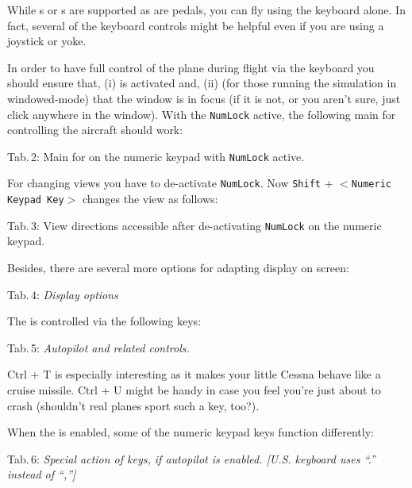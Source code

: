 While s or s are supported as are 
pedals, you can fly \FlightGear{} using the keyboard alone.  In fact, several of the keyboard
controls might be helpful even if you are using a joystick or yoke.  

In order to have full control
of the plane during flight via the keyboard you should ensure that, (i)  \texttt{}
is activated and, (ii) (for those running the simulation in windowed-mode) that the \FlightGear{} window is in focus (if it is not,
or you aren't sure, just click anywhere in the \FlightGear{} window).  With the \texttt{NumLock} active, the following main 
for controlling the aircraft should work:
 \eject

\noindent
 Tab.\,2: Main  for \FlightGear{} on the
 numeric keypad with \texttt{NumLock} active.
\medskip

\centerline{}
\vskip 5mm

For changing views you have to de-activate \texttt{NumLock}. Now \texttt{Shift}
+
$<$\texttt{Numeric Keypad Key}$>$ changes the view as follows:
\medskip

\noindent
 Tab.\,3: View directions
accessible after de-activating \texttt{NumLock} on the numeric keypad.
\medskip

\centerline{}
\vskip 5mm
Besides, there are several more options for adapting display on screen:
\vfill
\eject

\noindent
 Tab.\,4: \textit{Display options}
\medskip

\centerline{}
\vskip 5mm

The  is controlled via the following keys:
\medskip

\noindent
 Tab.\,5: \textit{Autopilot and related controls.}
\medskip

\centerline{}
\medskip

\noindent Ctrl + T is especially interesting as it makes your little Cessna
behave
like a cruise missile. Ctrl + U might be handy in case you feel you're just
about to
crash (shouldn't real planes sport such a key, too?).

When the  is enabled, some of the numeric keypad keys function differently:

\noindent
 Tab.\,6: \textit{Special action of keys, if autopilot is
 enabled. [U.S. keyboard uses ``.'' instead of ``,'']}
\medskip

